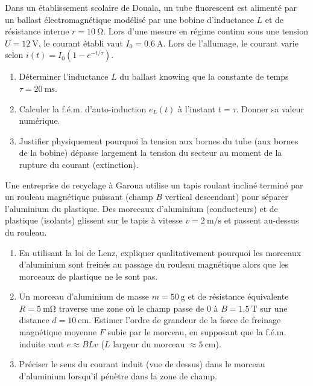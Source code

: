 \documentclass[11pt]{article}
\begin{document}
\begin{exercice}
Dans un établissement scolaire de Douala, un tube fluorescent est alimenté par un ballast électromagnétique modélisé par une bobine d'inductance $L$ et de résistance interne $r = \SI{10}{\ohm}$. Lors d'une mesure en régime continu sous une tension $U = \SI{12}{\volt}$, le courant établi vaut $I_0 = \SI{0,6}{\ampere}$. Lors de l'allumage, le courant varie selon $i(t) = I_0(1 - e^{-t/\tau})$.
\begin{enumerate}
    \item Déterminer l'inductance $L$ du ballast knowing que la constante de temps $\tau = \SI{20}{\milli\second}$.
    \item Calculer la f.é.m. d'auto-induction $e_L(t)$ à l'instant $t = \tau$. Donner sa valeur numérique.
    \item Justifier physiquement pourquoi la tension aux bornes du tube (aux bornes de la bobine) dépasse largement la tension du secteur au moment de la rupture du courant (extinction).
\end{enumerate}
\end{exercice}

\begin{exercice}
Une entreprise de recyclage à Garoua utilise un tapis roulant incliné terminé par un rouleau magnétique puissant (champ $B$ vertical descendant) pour séparer l'aluminium du plastique. Des morceaux d'aluminium (conducteurs) et de plastique (isolants) glissent sur le tapis à vitesse $v = \SI{2}{\metre\per\second}$ et passent au-dessus du rouleau.
\begin{enumerate}
    \item En utilisant la loi de Lenz, expliquer qualitativement pourquoi les morceaux d'aluminium sont freinés au passage du rouleau magnétique alors que les morceaux de plastique ne le sont pas.
    \item Un morceau d'aluminium de masse $m = \SI{50}{\gram}$ et de résistance équivalente $R = \SI{5}{\milli\ohm}$ traverse une zone où le champ passe de $0$ à $B = \SI{1,5}{\tesla}$ sur une distance $d = \SI{10}{\centi\metre}$. Estimer l'ordre de grandeur de la force de freinage magnétique moyenne $F$ subie par le morceau, en supposant que la f.é.m. induite vaut $e \approx B L v$ ($L$ largeur du morceau $\approx \SI{5}{\centi\metre}$).
    \item Préciser le sens du courant induit (vue de dessus) dans le morceau d'aluminium lorsqu'il pénètre dans la zone de champ.
\end{enumerate}
\end{exercice}
\end{document}
